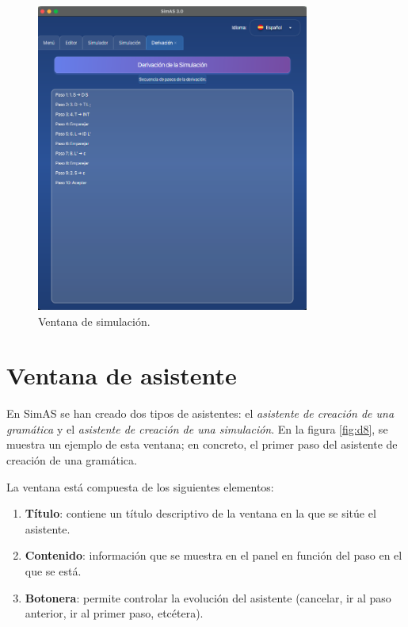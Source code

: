 \begin{figure}[htp]
\centering
	\includegraphics[width=0.8\textwidth]{figuras2/simulador/simulacion_derivacion.png}
	\caption{Ventana de simulación.}
	\label{fig:da24}
\end{figure}

\section{Ventana de asistente} \label{sec:ventana_asistente}

En SimAS se han creado dos tipos de asistentes: el \textit{asistente de creación de una gramática} y el \textit{asistente de creación de una simulación}. En la figura \ref{fig:d8}, se muestra un ejemplo de esta ventana; en concreto, el primer paso del asistente de creación de una gramática.

La ventana está compuesta de los siguientes elementos:
\begin{enumerate}
 \item \textbf{Título}: contiene un título descriptivo de la ventana en la que se sitúe el asistente.
 \item \textbf{Contenido}: información que se muestra en el panel en función del paso en el que se está.
 \item \textbf{Botonera}: permite controlar la evolución del asistente (cancelar, ir al paso anterior, ir al primer paso, etcétera).
\end{enumerate}

